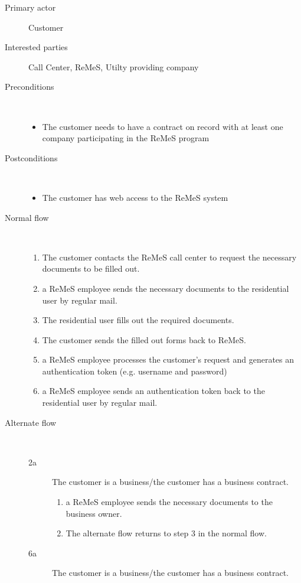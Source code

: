 \begin{description}
	\item[Primary actor] Customer
	\item[Interested parties] Call Center, ReMeS, Utilty providing company
	\item[Preconditions] \ 
	\begin{itemize}
		\item The customer needs to have a contract on record with at least one
		company participating in the ReMeS program
	\end{itemize}
	\item[Postconditions] \ 
	\begin{itemize}
		\item The customer has web access to the ReMeS system
	\end{itemize}
	\item[Normal flow] \ 
	\begin{enumerate}
		\item The customer contacts the ReMeS call center to request the necessary
		documents to be filled out.
		\item a ReMeS employee sends the necessary documents to the residential user
		by regular mail.
		\item The residential user fills out the required documents.
		\item The customer sends the filled out forms back to ReMeS.
		\item a ReMeS employee processes the customer’s request and generates an
		authentication token (e.g. username and password)
		\item a ReMeS employee sends an authentication token back to the residential
		user by regular mail.
	\end{enumerate}
	\item[Alternate flow] \ 
	\begin{description}
		\item[2a] The customer is a business/the customer has a business contract.
		\begin{enumerate}
			\item a ReMeS employee sends the necessary documents to the business owner.
			\item The alternate flow returns to step 3 in the normal flow.
		\end{enumerate}
		\item[6a] The customer is a business/the customer has a business contract.

\end{description}
\end{description}
